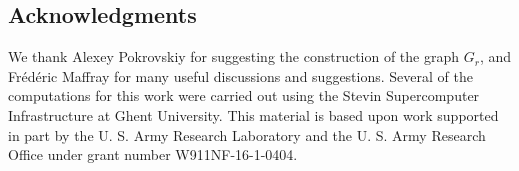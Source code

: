 \documentclass[11pt]{article}
\begin{document}
\subsection*{Acknowledgments}

We thank Alexey Pokrovskiy for suggesting the construction of the graph $G_r$, 
and Fr\'ed\'eric Maffray for many useful discussions and suggestions.
Several of the computations for this work were carried out using the Stevin Supercomputer Infrastructure at Ghent University.
This material is based upon work supported in part by the U. S. Army  Research 
Laboratory and the U. S. Army Research Office under    grant number 
W911NF-16-1-0404. 






\end{document}
